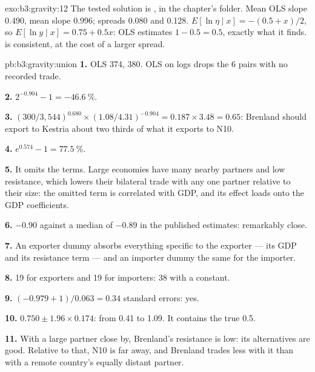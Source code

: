 \begin{solution}{exo:b3:gravity:12}
The tested solution is , in the chapter's
 folder. Mean OLS slope 0.490, mean  slope 0.996; spreads 0.080
and 0.128. %
$E[\ln \eta \mid x] = -(0.5 + x)/2$, so $E[\ln y \mid x] = 0.75 + 0.5x$: OLS estimates
$1 - 0.5 = 0.5$, exactly what it finds.  is consistent, at the cost of a larger
spread.
\end{solution}

\begin{solution}{pb:b3:gravity:union}
\textbf{1.} OLS 374,  380. OLS on logs drops the 6 pairs with no recorded
trade. %

\textbf{2.} $2^{-0.904} - 1 = -46.6~\%$.

\textbf{3.} $(300/3{,}544)^{0.680} \times (1.08/4.31)^{-0.904} = 0.187 \times 3.48 = 0.65$: Brenland should
export to Kestria about two thirds of what it exports to N10. %

\textbf{4.} $e^{0.574} - 1 = 77.5~\%$.

\textbf{5.} It omits the  terms. Large economies have many
nearby partners and low resistance, which lowers their bilateral trade with any
one partner relative to their size: the omitted term is correlated with GDP, and
its effect loads onto the GDP coefficients.

\textbf{6.} $-0.90$ against a median of $-0.89$ in the published estimates:
remarkably close. %

\textbf{7.} An exporter dummy absorbs everything specific to the exporter --- its
GDP and its resistance term --- and an importer dummy the same for the importer.

\textbf{8.} 19 for exporters and 19 for importers: 38 with a constant.

\textbf{9.} $(-0.979 + 1)/0.063 = 0.34$ standard errors: yes.

\textbf{10.} $0.750 \pm 1.96 \times 0.174$: from 0.41 to 1.09. It contains the true 0.5.

\textbf{11.} With a large partner close by, Brenland's resistance is low: its
alternatives are good. Relative to that, N10 is far away, and Brenland trades
less with it than with a remote country's equally distant partner.


\end{solution}
